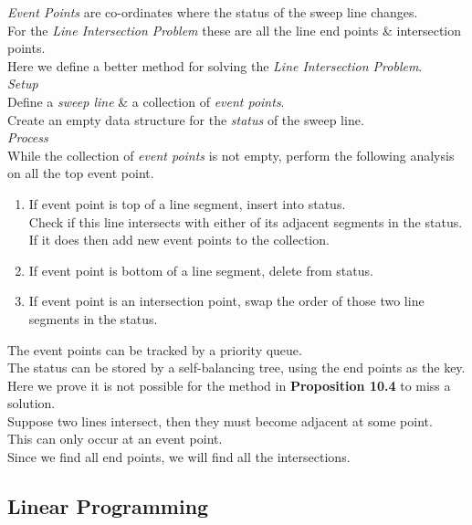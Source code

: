 \documentclass[11pt,a4paper]{article}
\begin{document}
\textit{Event Points} are co-ordinates where the status of the sweep line changes.\\
For the \textit{Line Intersection Problem} these are all the line end points \& intersection points.\\

Here we define a better method for solving the \textit{Line Intersection Problem}.\\
\textit{Setup}\\
Define a \textit{sweep line} \& a collection of \textit{event points}.\\
Create an empty data structure for the \textit{status} of the sweep line.\\
\textit{Process}\\
While the collection of \textit{event points} is not empty, perform the following analysis on all the top event point.
\begin{enumerate}[label=\roman*)]
  \item If event point is top of a line segment, insert into status.\\
  Check if this line intersects with either of its adjacent segments in the status.\\
  If it does then add new event points to the collection.
  \item If event point is bottom of a line segment, delete from status.
  \item If event point is an intersection point, swap the order of those two line segments in the status.
\end{enumerate}

The event points can be tracked by a priority queue.\\
The status can be stored by a self-balancing tree, using the end points as the key.\\

Here we prove it is not possible for the method in \textbf{Proposition 10.4} to miss a solution.\\
Suppose two lines intersect, then they must become adjacent at some point.\\
This can only occur at an event point.\\
Since we find all end points, we will find all the intersections.

\subsection{Linear Programming}
\end{document}
